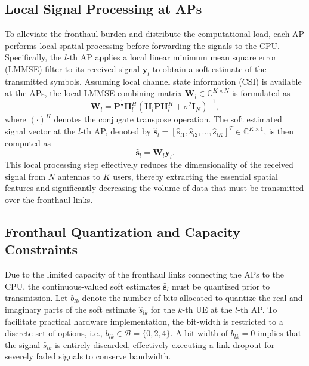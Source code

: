 \subsection{Local Signal Processing at APs}
To alleviate the fronthaul burden and distribute the computational load, each AP performs local spatial processing before forwarding the signals to the CPU. Specifically, the $l$-th AP applies a local linear minimum mean square error (LMMSE) filter to its received signal $\mathbf{y}_l$ to obtain a soft estimate of the transmitted symbols. Assuming local channel state information (CSI) is available at the APs, the local LMMSE combining matrix $\mathbf{W}_l \in \mathbb{C}^{K \times N}$ is formulated as
\begin{equation}
    \mathbf{W}_l = \mathbf{P}^{\frac{1}{2}} \mathbf{H}_l^H \left( \mathbf{H}_l \mathbf{P} \mathbf{H}_l^H + \sigma^2 \mathbf{I}_N \right)^{-1},
\end{equation}
where $(\cdot)^H$ denotes the conjugate transpose operation. The soft estimated signal vector at the $l$-th AP, denoted by $\hat{\mathbf{s}}_l = [\hat{s}_{l1}, \hat{s}_{l2}, \dots, \hat{s}_{lK}]^T \in \mathbb{C}^{K \times 1}$, is then computed as
\begin{equation}
    \hat{\mathbf{s}}_l = \mathbf{W}_l \mathbf{y}_l.
\end{equation}
This local processing step effectively reduces the dimensionality of the received signal from $N$ antennas to $K$ users, thereby extracting the essential spatial features and significantly decreasing the volume of data that must be transmitted over the fronthaul links.

\subsection{Fronthaul Quantization and Capacity Constraints}
Due to the limited capacity of the fronthaul links connecting the APs to the CPU, the continuous-valued soft estimates $\hat{\mathbf{s}}_l$ must be quantized prior to transmission. Let $b_{lk}$ denote the number of bits allocated to quantize the real and imaginary parts of the soft estimate $\hat{s}_{lk}$ for the $k$-th UE at the $l$-th AP. To facilitate practical hardware implementation, the bit-width is restricted to a discrete set of options, i.e., $b_{lk} \in \mathcal{B} = \{0, 2, 4\}$. A bit-width of $b_{lk} = 0$ implies that the signal $\hat{s}_{lk}$ is entirely discarded, effectively executing a link dropout for severely faded signals to conserve bandwidth.

